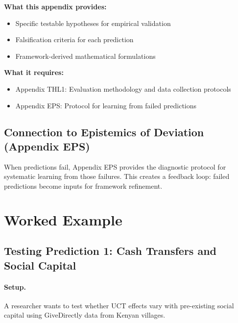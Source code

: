 \begin{tcolorbox}[colback=yellow!5!white, colframe=yellow!75!black,
    title=Integration: Appendix SUN $\leftrightarrow$ Appendix THL1]
\textbf{What this appendix provides:}
\begin{itemize}[nosep]
\item Specific testable hypotheses for empirical validation
\item Falsification criteria for each prediction
\item Framework-derived mathematical formulations
\end{itemize}

\textbf{What it requires:}
\begin{itemize}[nosep]
\item Appendix THL1: Evaluation methodology and data collection protocols
\item Appendix EPS: Protocol for learning from failed predictions
\end{itemize}
\end{tcolorbox}

\subsection{Connection to Epistemics of Deviation (Appendix EPS)}

When predictions fail, Appendix EPS provides the diagnostic protocol for systematic learning from those failures. This creates a feedback loop: failed predictions become inputs for framework refinement.



\section{Worked Example}
\label{sec:S-example}

\subsection{Testing Prediction 1: Cash Transfers and Social Capital}

\paragraph{Setup.}
A researcher wants to test whether UCT effects vary with pre-existing social capital using GiveDirectly data from Kenyan villages.

